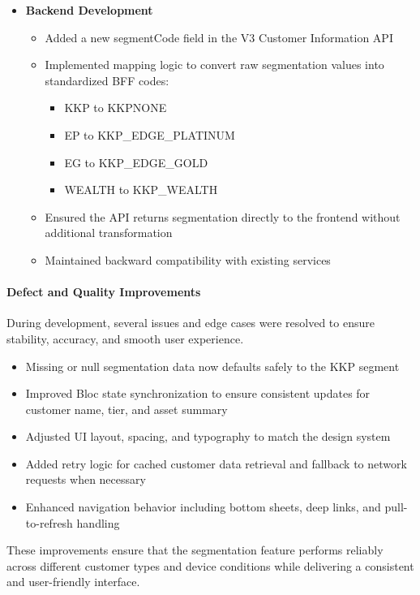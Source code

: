 \documentclass[12pt,oneside,openright,a4paper]{cpe-english-project}
\begin{document}
\begin{itemize}
\item \textbf{Backend Development}
  \begin{itemize}
  \item
    Added a new segmentCode field in the V3 Customer Information API
  \item
    Implemented mapping logic to convert raw segmentation values into
    standardized BFF codes:
  
    \begin{itemize}
    \item
      KKP to KKPNONE
    \item
      EP to KKP\_EDGE\_PLATINUM
    \item
      EG to KKP\_EDGE\_GOLD
    \item
      WEALTH to KKP\_WEALTH
    \end{itemize}
  \item
    Ensured the API returns segmentation directly to the frontend without
    additional transformation
  \item
    Maintained backward compatibility with existing services
  \end{itemize}
\end{itemize}

\paragraph{Defect and Quality Improvements}

During development, several issues and edge cases were resolved to
ensure stability, accuracy, and smooth user experience.

\begin{itemize}
\item
  Missing or null segmentation data now defaults safely to the KKP
  segment
\item
  Improved Bloc state synchronization to ensure consistent updates for
  customer name, tier, and asset summary
\item
  Adjusted UI layout, spacing, and typography to match the design system
\item
  Added retry logic for cached customer data retrieval and fallback to
  network requests when necessary
\item
  Enhanced navigation behavior including bottom sheets, deep links, and
  pull-to-refresh handling
\end{itemize}

These improvements ensure that the segmentation feature performs
reliably across different customer types and device conditions while
delivering a consistent and user-friendly interface.
\end{document}
